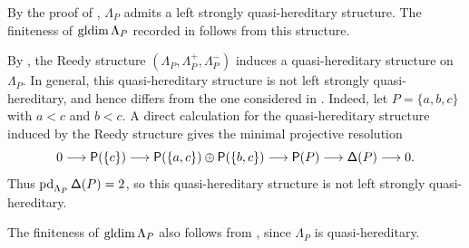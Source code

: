 \begin{remark}
\label{rem:reedy-versus-left-strongly-qh}
By the proof of \cite[Proposition~4.5]{AENY}, $\Lambda_P$ admits a
left strongly quasi-hereditary structure. 
The finiteness of
$\operatorname{gldim}\Lambda_P$ recorded in  follows from this structure.


By , the Reedy
structure $(\Lambda_P,\Lambda_P^+,\Lambda_P^-)$ induces a
quasi-hereditary structure on $\Lambda_P$.  In general, this
quasi-hereditary structure is not left strongly quasi-hereditary, and
hence differs from the one considered in \cite{AENY}.
Indeed, let $P=\{a,b,c\}$ with $a<c$ and
$b<c$.  A direct calculation for the quasi-hereditary structure
induced by the Reedy structure gives the minimal projective resolution
\[
0
\longrightarrow
\mathsf P(\{c\})
\longrightarrow
\mathsf P(\{a,c\})\oplus\mathsf P(\{b,c\})
\longrightarrow
\mathsf P(P)
\longrightarrow
\mathsf\Delta(P)
\longrightarrow
0.
\]
Thus $\operatorname{pd}_{\Lambda_P}\mathsf\Delta(P)=2$, so this quasi-hereditary structure is
not left strongly quasi-hereditary.

The finiteness of $\operatorname{gldim}\Lambda_P$ also follows from
, since
$\Lambda_P$ is quasi-hereditary.
\end{remark}
